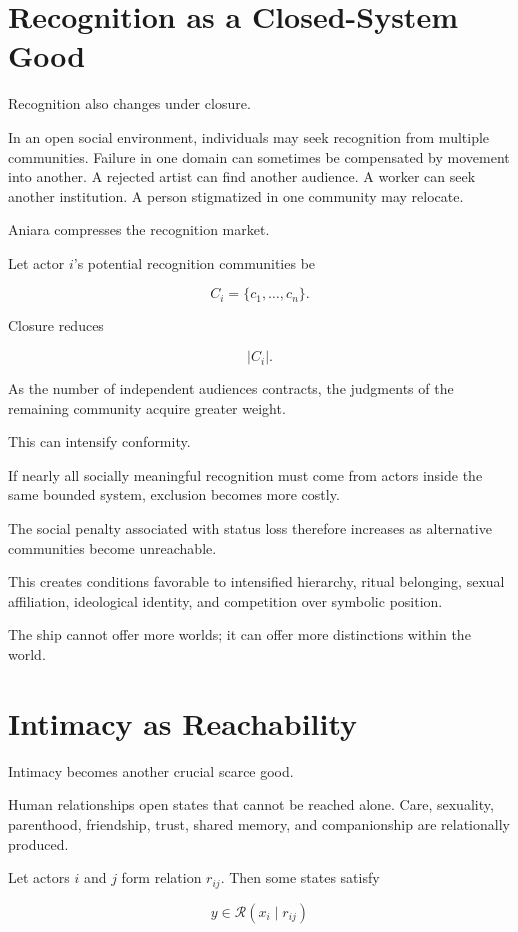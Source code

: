 \documentclass[11pt,oneside]{book}
\theoremstyle{definition}
\theoremstyle{remark}
\newcommand{\R}{\mathcal{R}}
\begin{document}
\section{Recognition as a Closed-System Good}

Recognition also changes under closure.

In an open social environment, individuals may seek recognition from multiple communities. Failure in one domain can sometimes be compensated by movement into another. A rejected artist can find another audience. A worker can seek another institution. A person stigmatized in one community may relocate.

Aniara compresses the recognition market.

Let actor \(i\)'s potential recognition communities be

\[
C_i
=
\{c_1,\ldots,c_n\}.
\]

Closure reduces

\[
|C_i|.
\]

As the number of independent audiences contracts, the judgments of the remaining community acquire greater weight.

This can intensify conformity.

If nearly all socially meaningful recognition must come from actors inside the same bounded system, exclusion becomes more costly.

The social penalty associated with status loss therefore increases as alternative communities become unreachable.

This creates conditions favorable to intensified hierarchy, ritual belonging, sexual affiliation, ideological identity, and competition over symbolic position.

The ship cannot offer more worlds; it can offer more distinctions within the world.

\section{Intimacy as Reachability}

Intimacy becomes another crucial scarce good.

Human relationships open states that cannot be reached alone. Care, sexuality, parenthood, friendship, trust, shared memory, and companionship are relationally produced.

Let actors \(i\) and \(j\) form relation \(r_{ij}\). Then some states satisfy

\[
y\in\R(x_i\mid r_{ij})
\]
\end{document}
